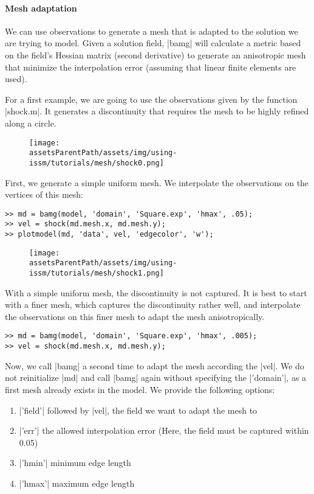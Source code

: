 \paragraph{Mesh adaptation}%
We can use observations to generate a mesh that is adapted to the solution we are trying to model. Given a solution field, \lstinlinebg|bamg| will calculate a metric based on the field's Hessian matrix (second derivative) to generate an anisotropic mesh that minimize the interpolation error (assuming that linear finite elements are used).

For a first example, we are going to use the observations given by the function \lstinlinebg|shock.m|. It generates a discontinuity that requires the mesh to be highly refined along a circle.
\begin{figure}[H]
	\begin{center}
		\texttt{[image: \\assetsParentPath/assets/img/using-issm/tutorials/mesh/shock0.png]}
	\end{center}
\end{figure}
First, we generate a simple uniform mesh. We interpolate the observations on the vertices of this mesh:
\begin{lstlisting}
>> md = bamg(model, 'domain', 'Square.exp', 'hmax', .05);
>> vel = shock(md.mesh.x, md.mesh.y);
>> plotmodel(md, 'data', vel, 'edgecolor', 'w');
\end{lstlisting}
\begin{figure}[H]
	\begin{center}
		\texttt{[image: \\assetsParentPath/assets/img/using-issm/tutorials/mesh/shock1.png]}
	\end{center}
\end{figure}
With a simple uniform mesh, the discontinuity is not captured. It is best to start with a finer mesh, which captures the discontinuity rather well, and interpolate the observations on this finer mesh to adapt the mesh anisotropically.
\begin{lstlisting}
>> md = bamg(model, 'domain', 'Square.exp', 'hmax', .005);
>> vel = shock(md.mesh.x, md.mesh.y);
\end{lstlisting}
Now, we call \lstinlinebg|bamg| a second time to adapt the mesh according the \lstinlinebg|vel|. We do not reinitialize \lstinlinebg|md| and call \lstinlinebg|bamg| again without specifying the \lstinlinebg|'domain'|, as a first mesh already exists in the model. We provide the following options:
\begin{enumerate}
	\item \lstinlinebg|'field'| followed by \lstinlinebg|vel|, the field we want to adapt the mesh to
	\item \lstinlinebg|'err'| the allowed interpolation error (Here, the field must be captured within 0.05)
	\item \lstinlinebg|'hmin'| minimum edge length
	\item \lstinlinebg|'hmax'| maximum edge length
\end{enumerate}
